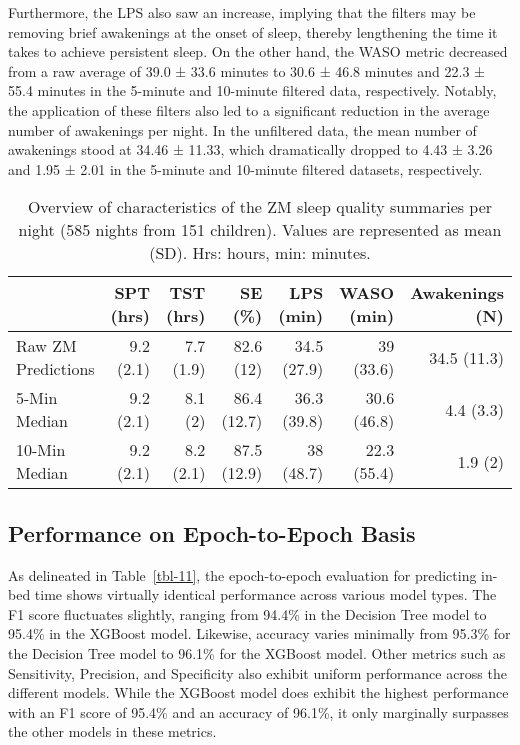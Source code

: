 \documentclass[
  9pt,
]{scrbook}
\begin{document}
Furthermore, the LPS also saw an increase, implying that the filters may
be removing brief awakenings at the onset of sleep, thereby lengthening
the time it takes to achieve persistent sleep. On the other hand, the
WASO metric decreased from a raw average of 39.0 ± 33.6 minutes to 30.6
± 46.8 minutes and 22.3 ± 55.4 minutes in the 5-minute and 10-minute
filtered data, respectively. Notably, the application of these filters
also led to a significant reduction in the average number of awakenings
per night. In the unfiltered data, the mean number of awakenings stood
at 34.46 ± 11.33, which dramatically dropped to 4.43 ± 3.26 and 1.95 ±
2.01 in the 5-minute and 10-minute filtered datasets, respectively.

\begingroup

\footnotesize

\hypertarget{tbl-10}{}
\begin{longtable}{lrrrrrr}
\caption{\label{tbl-10}Overview of characteristics of the ZM sleep quality summaries per night
(585 nights from 151 children). Values are represented as mean (SD).
Hrs: hours, min: minutes. }\tabularnewline

\toprule
 & SPT (hrs) & TST (hrs) & SE (\%) & LPS (min) & WASO (min) & Awakenings (N) \\ 
\midrule
Raw ZM Predictions & 9.2 (2.1) & 7.7 (1.9) & 82.6 (12) & 34.5 (27.9) & 39 (33.6) & 34.5 (11.3) \\ 
5-Min Median & 9.2 (2.1) & 8.1 (2) & 86.4 (12.7) & 36.3 (39.8) & 30.6 (46.8) & 4.4 (3.3) \\ 
10-Min Median & 9.2 (2.1) & 8.2 (2.1) & 87.5 (12.9) & 38 (48.7) & 22.3 (55.4) & 1.9 (2) \\ 
\bottomrule
\end{longtable}

\endgroup

\hypertarget{performance-on-epoch-to-epoch-basis}{%
\subsection{Performance on Epoch-to-Epoch
Basis}\label{performance-on-epoch-to-epoch-basis}}

As delineated in Table~\ref{tbl-11}, the epoch-to-epoch evaluation for
predicting in-bed time shows virtually identical performance across
various model types. The F1 score fluctuates slightly, ranging from
94.4\% in the Decision Tree model to 95.4\% in the XGBoost model.
Likewise, accuracy varies minimally from 95.3\% for the Decision Tree
model to 96.1\% for the XGBoost model. Other metrics such as
Sensitivity, Precision, and Specificity also exhibit uniform performance
across the different models. While the XGBoost model does exhibit the
highest performance with an F1 score of 95.4\% and an accuracy of
96.1\%, it only marginally surpasses the other models in these metrics.
\end{document}
